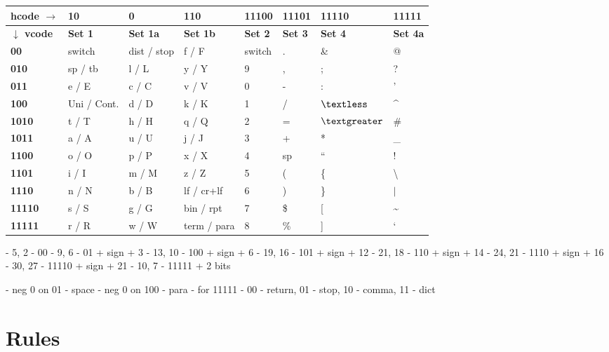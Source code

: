 \documentclass[]{article}
\begin{document}
\begin{center}
	\begin{tabular}{ | l | l | l | l | l | l | l | l | } \hline
		\textbf{hcode $\rightarrow$} & \textbf{10} & \textbf{0} & \textbf{110} & \textbf{11100} & \textbf{11101} & \textbf{11110} & \textbf{11111} \\ \hline
		\textbf{$\downarrow$ vcode} & \textbf{Set 1} & \textbf{Set 1a} & \textbf{Set 1b} & \textbf{Set 2} & \textbf{Set 3} & \textbf{Set 4} & \textbf{Set 4a} \\ \hline
		\textbf{00} & switch & dist / stop & f / F & switch & . & \& & @ \\ \hline
		\textbf{010} & sp / tb & l / L & y / Y & 9 & , & ; & ? \\ \hline
		\textbf{011} & e / E & c / C & v / V & 0 & - & : & ' \\ \hline
		\textbf{100} & Uni / Cont. & d / D & k / K & 1 & / & $\textless$ & \^{} \\ \hline
		\textbf{1010} & t / T & h / H & q / Q & 2 & = & $\textgreater$ & \# \\ \hline
		\textbf{1011} & a / A & u / U & j / J & 3 & + & * & \_ \\ \hline
		\textbf{1100} & o / O & p / P & x / X & 4 & sp & \textquotedblleft & ! \\ \hline
		\textbf{1101} & i / I & m / M & z / Z & 5 & ( & \{ & \textbackslash \\ \hline
		\textbf{1110} & n / N & b / B & lf / cr+lf & 6 & ) & \} & $|$ \\ \hline
		\textbf{11110} & s / S & g / G & bin / rpt & 7 & \$ & [ & \~{} \\ \hline
		\textbf{11111} & r / R & w / W & term / para & 8 & \% & ] & ` \\ \hline
	\end{tabular}
\end{center}

-  5,  2 - 00
-  9,  6 - 01 + sign + 3
- 13, 10 - 100 + sign + 6
- 19, 16 - 101 + sign + 12
- 21, 18 - 110 + sign + 14
- 24, 21 - 1110 + sign + 16
- 30, 27 - 11110 + sign + 21
- 10,  7 - 11111 + 2 bits

- neg 0 on 01 - space
- neg 0 on 100 - para
- for 11111 - 00 - return, 01 - stop, 10 - comma, 11 - dict

\section{Rules}
\end{document}
